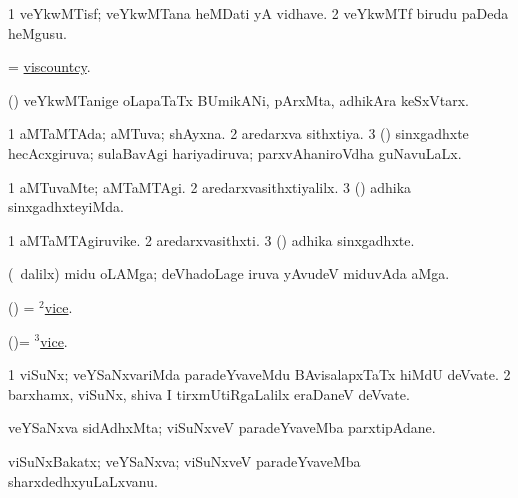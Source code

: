 \bentry
{} 
\gl{\nA}
\expl{}
\bmng
\bnum
\num{1} veYkwMTisf; veYkwMTana heMDati yA vidhave. 
\num{2} veYkwMTf birudu paDeda heMgusu. 
\enum
\emng
\eentry

\bentry 
{} 
\gl{\nA}
\expl{}
\bmng
 = \hyperlink{viscountcy}{viscountcy}. 
\emng
\eentry

\bentry
{} 
\gl{\nA}
\bmng
 (\ca) veYkwMTanige oLapaTaTx BUmikANi, pArxMta, adhikAra keSxVtarx. 
\emng
\eentry

\bentry
{} 
\gl{\gu}
\expl{}
\bmng
\bnum
\num{1} aMTaMTAda; aMTuva; shAyxna. 
\num{2} aredarxva sithxtiya. 
\num{3} (\Bwvi) sinxgadhxte hecAcxgiruva; sulaBavAgi hariyadiruva; parxvAhaniroVdha guNavuLaLx. 
\enum
\emng
\eentry

\bentry
{} 
\gl{\kirxvi}
\expl{}
\bmng
\bnum
\num{1} aMTuvaMte; aMTaMTAgi. 
\num{2} aredarxvasithxtiyalilx. 
\num{3} (\Bwvi) adhika sinxgadhxteyiMda. 
\enum
\emng
\eentry

\bentry
{} 
\gl{\nA}
\expl{}
\bmng
\bnum
\num{1} aMTaMTAgiruvike. 
\num{2} aredarxvasithxti. 
\num{3} (\Bwvi) adhika sinxgadhxte. 
\enum
\emng
\eentry

\bentry
{} 
\gl{\nA}
\bmng
 (\sA\ \bava dalilx) midu oLAMga; deVhadoLage iruva yAvudeV miduvAda aMga. 
\emng
\eentry

\bentry 
{} 
\gl{\nA}
\expl{}
\bmng
 (\ame) = \hyperlink{vice(2)}{$^2$vice}. 
\emng
\eentry

\bentry
{} 
\gl{\sakirx}
\expl{}
\bmng
 (\ame)= \hyperlink{vice(3)}{$^3$vice}. 
\emng
\eentry

\bentry
{} 
\gl{\nA}
\expl{}
\bmng
\bnum
\num{1} viSuNx; veYSaNxvariMda paradeYvaveMdu BAvisalapxTaTx hiMdU deVvate. 
\num{2} barxhamx, viSuNx, shiva I tirxmUtiRgaLalilx eraDaneV deVvate. 
\enum
\emng
\eentry

\bentry
{} 
\gl{\nA}
\expl{}
\bmng
 veYSaNxva sidAdhxMta; viSuNxveV paradeYvaveMba parxtipAdane. 
\emng
\eentry

\bentry
{} 
\gl{\nA}
\expl{}
\bmng
 viSuNxBakatx; veYSaNxva; viSuNxveV paradeYvaveMba sharxdedhxyuLaLxvanu. 
\emng
\eentry

